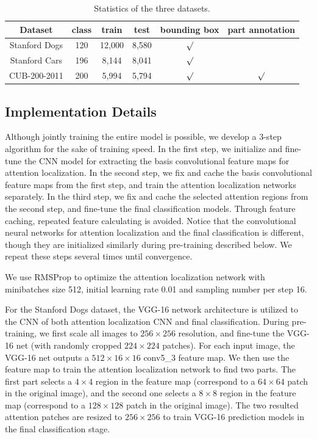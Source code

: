 \documentclass[runningheads]{llncs}
\begin{document}
\begin{table}[htb]
\begin{center}
\begin{tabular}
{c|c|c|c|c|c}\hline
Dataset & class & train & test & bounding box & part annotation   \\\hline\hline
Stanford Dogs & 120 & 12,000  &  8,580 & $\surd$ &    \\
Stanford Cars & 196 & 8,144  & 8,041 & $\surd$ &  \\
CUB-200-2011 & 200 & 5,994 & 5,794 & $\surd$ & $\surd$ \\\hline
\end{tabular}
\caption{Statistics of the three datasets.}
\vspace{-20pt}
\end{center}
\end{table}

\subsection{Implementation Details}
Although jointly training the entire model is possible, we develop a 3-step algorithm for the sake of training speed.
In the first step, we initialize and fine-tune the CNN model for extracting the basis convolutional feature maps for attention localization.
In the second step, we fix and cache the basis convolutional feature maps from the first step, and train the attention localization networks separately.
In the third step, we fix and cache the selected attention regions from the second step, and fine-tune the final classification models.
Through feature caching, repeated feature calculating is avoided.
Notice that the convolutional neural networks for attention localization and the final classification is different, though they are initialized similarly during pre-training described below.
We repeat these steps several times until convergence.

We use RMSProp to optimize the attention localization network with minibatches size 512, initial learning rate 0.01 and sampling number per step 16.

For the Stanford Dogs dataset, the VGG-16 \cite{bd8} network architecture is utilized to the CNN of both attention localization CNN and final classification.
During pre-training, we first scale all images to $256 \times256 $ resolution, and fine-tune the VGG-16 net (with randomly cropped $224\times224$ patches).
For each input image, the VGG-16 net outputs a $512\times16\times16$ conv5\_3 feature map.
We then use the feature map to train the attention localization network to find two parts.
The first part selects a $4\times4$ region in the feature map (correspond to a $64\times64$ patch in the original image), and the second one selects a $8\times8$ region in the feature map (correspond to a $128\times128$ patch in the original image).
The two resulted attention patches are resized to $256\times256$ to train VGG-16 prediction models in the final classification stage.
\end{document}
